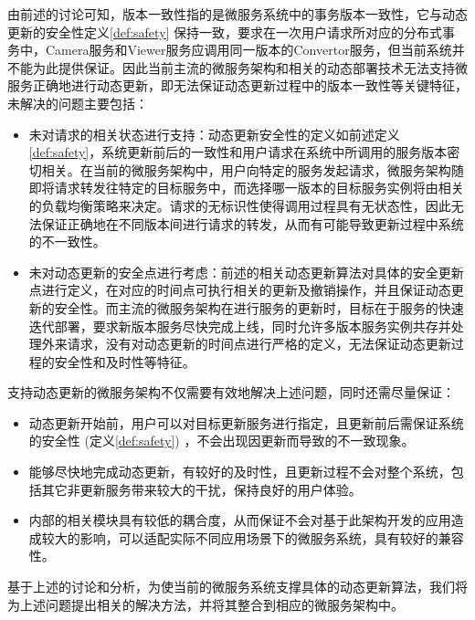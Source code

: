 \documentclass[macfonts,master]{njuthesis}
\begin{document}
由前述的讨论可知，版本一致性指的是微服务系统中的事务版本一致性，它与动态更新的安全性定义\ref{def:safety} 保持一致，要求在一次用户请求所对应的分布式事务中，Camera服务和Viewer服务应调用同一版本的Convertor服务，但当前系统并不能为此提供保证。因此当前主流的微服务架构和相关的动态部署技术无法支持微服务正确地进行动态更新，即无法保证动态更新过程中的版本一致性等关键特征，未解决的问题主要包括：

\begin{itemize}
	\item 未对请求的相关状态进行支持：动态更新安全性的定义如前述定义\ref{def:safety}，系统更新前后的一致性和用户请求在系统中所调用的服务版本密切相关。在当前的微服务架构中，用户向特定的服务发起请求，微服务架构随即将请求转发往特定的目标服务中，而选择哪一版本的目标服务实例将由相关的负载均衡策略来决定。请求的无标识性使得调用过程具有无状态性，因此无法保证正确地在不同版本间进行请求的转发，从而有可能导致更新过程中系统的不一致性。
	\item 未对动态更新的安全点进行考虑：前述的相关动态更新算法对具体的安全更新点进行定义，在对应的时间点可执行相关的更新及撤销操作，并且保证动态更新的安全性。而主流的微服务架构在进行服务的更新时，目标在于服务的快速迭代部署，要求新版本服务尽快完成上线，同时允许多版本服务实例共存并处理外来请求，没有对动态更新的时间点进行严格的定义，无法保证动态更新过程的安全性和及时性等特征。
\end{itemize}




支持动态更新的微服务架构不仅需要有效地解决上述问题，同时还需尽量保证：

\begin{itemize}
	\item 动态更新开始前，用户可以对目标更新服务进行指定，且更新前后需保证系统的安全性 (定义\ref{def:safety}) ，不会出现因更新而导致的不一致现象。
	\item 能够尽快地完成动态更新，有较好的及时性，且更新过程不会对整个系统，包括其它非更新服务带来较大的干扰，保持良好的用户体验。
	\item 内部的相关模块具有较低的耦合度，从而保证不会对基于此架构开发的应用造成较大的影响，可以适配实际不同应用场景下的微服务系统，具有较好的兼容性。
\end{itemize}

基于上述的讨论和分析，为使当前的微服务系统支撑具体的动态更新算法，我们将为上述问题提出相关的解决方法，并将其整合到相应的微服务架构中。
\end{document}
